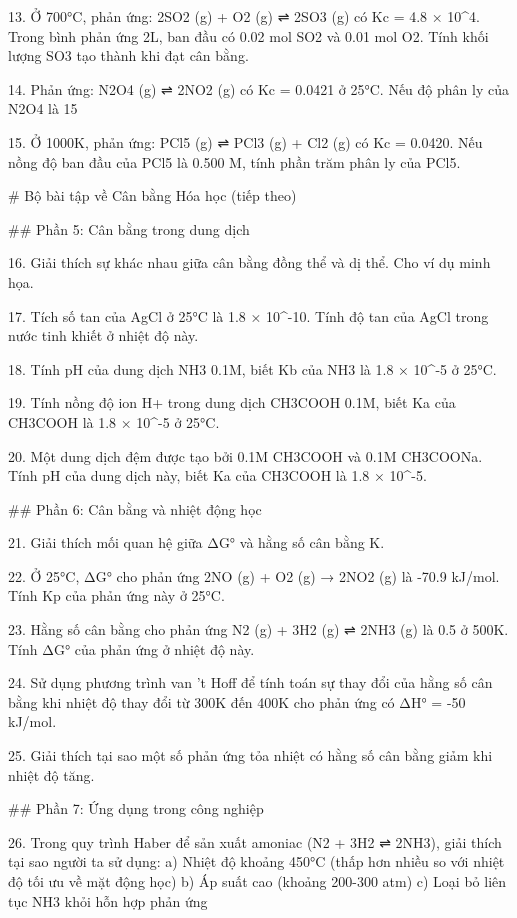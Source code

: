 13. Ở 700°C, phản ứng: 2SO2 (g) + O2 (g) ⇌ 2SO3 (g) có Kc = 4.8 × 10^4. Trong bình phản ứng 2L, ban đầu có 0.02 mol SO2 và 0.01 mol O2. Tính khối lượng SO3 tạo thành khi đạt cân bằng.

14. Phản ứng: N2O4 (g) ⇌ 2NO2 (g) có Kc = 0.0421 ở 25°C. Nếu độ phân ly của N2O4 là 15%

15. Ở 1000K, phản ứng: PCl5 (g) ⇌ PCl3 (g) + Cl2 (g) có Kc = 0.0420. Nếu nồng độ ban đầu của PCl5 là 0.500 M, tính phần trăm phân ly của PCl5.


# Bộ bài tập về Cân bằng Hóa học (tiếp theo)

## Phần 5: Cân bằng trong dung dịch

16. Giải thích sự khác nhau giữa cân bằng đồng thể và dị thể. Cho ví dụ minh họa.

17. Tích số tan của AgCl ở 25°C là 1.8 × 10^-10. Tính độ tan của AgCl trong nước tinh khiết ở nhiệt độ này.

18. Tính pH của dung dịch NH3 0.1M, biết Kb của NH3 là 1.8 × 10^-5 ở 25°C.

19. Tính nồng độ ion H+ trong dung dịch CH3COOH 0.1M, biết Ka của CH3COOH là 1.8 × 10^-5 ở 25°C.

20. Một dung dịch đệm được tạo bởi 0.1M CH3COOH và 0.1M CH3COONa. Tính pH của dung dịch này, biết Ka của CH3COOH là 1.8 × 10^-5.

## Phần 6: Cân bằng và nhiệt động học

21. Giải thích mối quan hệ giữa ΔG° và hằng số cân bằng K.

22. Ở 25°C, ΔG° cho phản ứng 2NO (g) + O2 (g) → 2NO2 (g) là -70.9 kJ/mol. Tính Kp của phản ứng này ở 25°C.

23. Hằng số cân bằng cho phản ứng N2 (g) + 3H2 (g) ⇌ 2NH3 (g) là 0.5 ở 500K. Tính ΔG° của phản ứng ở nhiệt độ này.

24. Sử dụng phương trình van 't Hoff để tính toán sự thay đổi của hằng số cân bằng khi nhiệt độ thay đổi từ 300K đến 400K cho phản ứng có ΔH° = -50 kJ/mol.

25. Giải thích tại sao một số phản ứng tỏa nhiệt có hằng số cân bằng giảm khi nhiệt độ tăng.

## Phần 7: Ứng dụng trong công nghiệp

26. Trong quy trình Haber để sản xuất amoniac (N2 + 3H2 ⇌ 2NH3), giải thích tại sao người ta sử dụng:
    a) Nhiệt độ khoảng 450°C (thấp hơn nhiều so với nhiệt độ tối ưu về mặt động học)
    b) Áp suất cao (khoảng 200-300 atm)
    c) Loại bỏ liên tục NH3 khỏi hỗn hợp phản ứng

